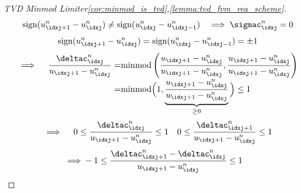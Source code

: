 \begin{proofbox}\nospacing
    \begin{proof}[TVD Minmod Limiter\cref{cor:minmod_is_tvd},\cref{lemma:tvd_fvm_rea_scheme}]\label{proof:tvd_minmod_limiter}
      \begin{align*}
        \text{sign}(u_{\idxj+1}^{n}-u_{\idxj}^{n})\neq\text{sign}(u_{\idxj}^{n}-u_{\idxj-1}^{n})&&\implies\sigmac_{\idxj}^{n}=0
      \end{align*}
      \begin{align*}
        \text{sign}(u_{\idxj+1}^{n}-u_{\idxj}^{n})=\text{sign}(u_{\idxj}^{n}-u_{\idxj-1}^{n})=\pm1
      \end{align*}
      \begin{align*}
        \implies\quad\frac{\deltac_{\idxj}^{n}}{u_{\idxj+1}-u_{\idxj}^{n}}=&\text{minmod}\left(\frac{{u_{\idxj+1}-u_{\idxj}^{n}}}{u_{\idxj+1}-u_{\idxj}^{n}},\frac{{u_{\idxj+1}-u_{\idxj}^{n}}}{u_{\idxj+1}-u_{\idxj}^{n}}\right)\\[-1\jot]
        =&\text{minmod}\Big(1,\underbrace{\frac{{u_{\idxj+1}-u_{\idxj}^{n}}}{u_{\idxj+1}-u_{\idxj}^{n}}}_{\geq0}\Big)\leq 1
      \end{align*}
      \begin{align*}
        \implies\quad 0\leq\frac{\deltac_{\idxj}^{n}}{u_{\idxj+1}-u_{\idxj}^{n}}\leq 1&&0\leq\frac{\deltac_{\idxj+1}^{n}}{u_{\idxj+1}-u_{\idxj}^{n}}\leq 1
      \end{align*}
      \begin{align}
        \implies&-1\leq\frac{\deltac_{\idxj+1}^{n}-\deltac_{\idxj}^{n}}{u_{\idxj+1}-u_{\idxj}^{n}}\leq 1
      \end{align}
    \end{proof}
\end{proofbox}

